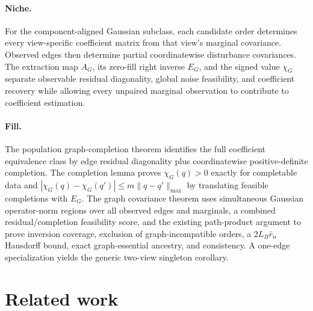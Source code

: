 \documentclass{article}
\begin{document}
\paragraph{Niche.} For the component-aligned Gaussian subclass, each candidate order determines every view-specific coefficient matrix from that view's marginal covariance. Observed edges then determine partial coordinatewise disturbance covariances. The extraction map \(A_G\), its zero-fill right inverse \(E_G\), and the signed value \(\chi_G\) separate observable residual diagonality, global noise feasibility, and coefficient recovery while allowing every unpaired marginal observation to contribute to coefficient estimation.

\paragraph{Fill.} The population graph-completion theorem identifies the full coefficient equivalence class by edge residual diagonality plus coordinatewise positive-definite completion. The completion lemma proves \(\chi_G(q)>0\) exactly for completable data and \(|\chi_G(q)-\chi_G(q')|\le m\|q-q'\|_{\max}\) by translating feasible completions with \(E_G\). The graph covariance theorem uses simultaneous Gaussian operator-norm regions over all observed edges and marginals, a combined residual/completion feasibility score, and the existing path-product argument to prove inversion coverage, exclusion of graph-incompatible orders, a \(2L_B\bar r_n\) Hausdorff bound, exact graph-essential ancestry, and consistency. A one-edge specialization yields the generic two-view singleton corollary.

\section{Related work}
\end{document}
